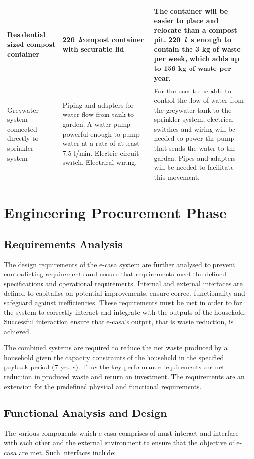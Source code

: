 \documentclass[a4paper,11pt,fleqn]{report}
\begin{document}
\begin{center}
\begin{longtable}{p{3cm}|p{5.5cm}|p{5.5cm}}
            \hline
    Residential sized compost container & 220~\textit{l}compost container with securable lid  & The container will be easier to place and relocate than a compost pit. 220~\textit{l} is enough to contain the 3 kg of waste per week, which adds up to 156 kg of waste per year.\\
            \hline
    Greywater system connected directly to sprinkler system & Piping and adapters for water flow from tank to garden. A water pump powerful enough to pump water at a rate of at least 7.5 l/min. Electric circuit switch. Electrical wiring.  & For the user to be able to control the flow of water from the greywater tank to the sprinkler system, electrical switches and wiring will be needed to power the pump that sends the water to the garden. Pipes and adapters will be needed to facilitate this movement.\\

    \bottomrule
\end{longtable}
\end{center}
%
\section{Engineering Procurement Phase}
\subsection{Requirements Analysis}
The design requirements of the e-casa system are further analysed to prevent contradicting requirements and ensure that requirements meet the defined specifications and operational requirements. Internal and external interfaces are defined to capitalise on potential improvements, ensure correct functionality and safeguard against inefficiencies. These requirements must be met in order to for the system to correctly interact and integrate with the outputs of the household. Successful interaction ensure that e-casa’s output, that is waste reduction, is achieved.

The combined systems are required to reduce the net waste produced by a household given the capacity constraints of the household in the specified payback period (7 years). Thus the key performance requirements are net reduction in produced waste and return on investment. The requirements are an extension for the predefined physical and functional requirements.


\subsection{Functional Analysis and Design}
The various components which e-casa comprises of must interact and interface with each other and the external environment to ensure that the objective of e-casa are met. Such interfaces include:\\
\end{document}
